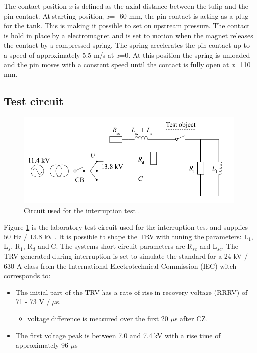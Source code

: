 \documentclass[10pt,a4paper,twoside]{article}
\begin{document}
The contact position \textit{x} is defined as the axial distance between the tulip and the pin contact. At starting position, \textit{x}= -60 mm, the pin contact is acting as a plug for the tank. This is making it possible to set on upstream pressure. The contact is hold in place by a electromagnet and is set to motion when the magnet releases the contact by a compressed spring. The spring accelerates the pin contact up to a speed of approximately 5.5 m/s at \textit{x}=0. At this position the spring is unloaded  and the pin moves with a constant speed until the contact is fully open at \textit{x}=110 mm.

\subsection{Test circuit}

\begin{figure} [H]
\centering
\includegraphics[scale=0.3]{Bilder/Method/circuit.png}
\caption{Circuit used for the interruption test \cite{bib:AFIMVLBA}.} \label{fig:testCurcuit}
\end{figure}

Figure \ref{fig:testCurcuit} is the laboratory test circuit used for the interruption test and supplies 50 Hz / 13.8 kV . It is possible to shape the TRV with tuning the parameters: L$_1$, L$_s$, R$_1$, R$_d$ and C. The systems short circuit parameters are R$_{sc}$ and L$_{sc}$. The TRV generated during interruption is set to simulate the standard for a 24 kV / 630 A class from the International Electrotechnical Commission (IEC) witch corresponds to:

\begin{itemize}
\item The initial part of the TRV has a rate of rise in recovery voltage (RRRV) of 71 - 73 V / $\mu$s.
	\begin{itemize}
		\item voltage difference is measured over the first 20 $\mu$s after CZ.
	\end{itemize}
\item The first voltage peak is between 7.0 and 7.4 kV with a rise time of approximately 96 $\mu$s
\end{itemize}
\end{document}
